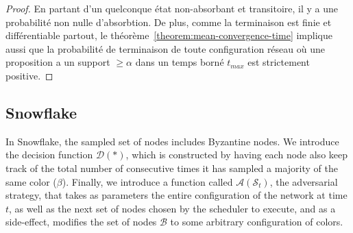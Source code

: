 \documentclass[letterpaper,twocolumn,10pt]{article}
\theoremstyle{definition}
\begin{document}
\begin{appendices}
\begin{proof}
En partant d'un quelconque état non-absorbant et transitoire, il y a une probabilité non nulle d'absorbtion. De plus, comme la terminaison est finie et différentiable partout, le théorème~\ref{theorem:mean-convergence-time} implique aussi que la probabilité de terminaison de toute configuration réseau où une proposition a un support $\geq \alpha$ dans un temps borné $t_{max}$ est strictement positive.
\end{proof}

\subsection{Snowflake}
\label{subsection:appendix_snowflake}
In Snowflake, the sampled set of nodes includes Byzantine nodes.
We introduce the decision function $\mathcal{D}(*)$, which is constructed by having each node also keep track of the total number of consecutive times it has sampled a majority of the same color ($\beta$). 
Finally, we introduce a function called $\mathcal{A}(\mathcal{S}_t)$, the adversarial strategy, that takes as parameters the entire configuration of the network at time $t$, as well as the next set of nodes chosen by the scheduler to execute, and as a side-effect, modifies the set of nodes $\mathcal{B}$ to some arbitrary configuration of colors.


\end{appendices}
\end{document}
